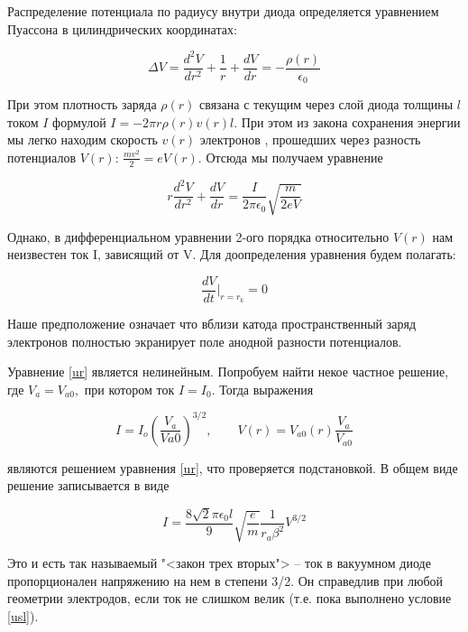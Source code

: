 \documentclass[12pt]{kiarticle} %
\begin{document}
Распределение потенциала по радиусу внутри диода определяется уравнением Пуассона в цилиндрических координатах:

\begin{equation}\label{}
\Delta V = \dfrac{d^2V}{dr^2} + \dfrac{1}{r} + \dfrac{dV}{dr} = - \dfrac{\rho(r)}{\epsilon_0}
\end{equation}

При этом плотность заряда $ \rho(r) $ связана с текущим через слой диода толщины $ l $ током $ I $ формулой $ I = -2\pi r \rho(r)v(r)l$. При этом из закона сохранения энергии мы легко находим скорость $ v(r) $ электронов , прошедших через разность потенциалов $ V(r) $: $ \frac{mv^2}{2} = eV(r) $.  Отсюда мы получаем уравнение 

\begin{equation}\label{ur}
r \dfrac{d^2V}{dr^2} + \dfrac{dV}{dr} = \dfrac{I}{2\pi\epsilon_0}\sqrt{\dfrac{m}{2eV}}
\end{equation}

Однако, в дифференциальном уравнении 2-ого порядка относительно $ V(r) $ нам неизвестен ток I, зависящий от V. Для доопределения уравнения будем полагать:

\begin{equation}\label{usl}
\dfrac{dV}{dt}\bigg |_{r=r_k} = 0
\end{equation} 

Наше предположение означает что вблизи катода пространственный заряд электронов полностью экранирует поле анодной разности потенциалов.

Уравнение \eqref{ur} является нелинейным. Попробуем  найти некое частное решение, где $ V_a = V_{a0}, $ при котором ток $ I = I_0 $. Тогда выражения 

\begin{equation}\label{}
I = I_o \left( \dfrac{V_a}{V{a0}} \right) ^{3/2}, \qquad V(r) = V_{a0}(r)\dfrac{V_a}{V_{a0}}
\end{equation}

являются решением уравнения \eqref{ur}, что проверяется подстановкой. В общем виде решение записывается в виде

\begin{equation}\label{3/2}
I = \dfrac{8\sqrt{2}\pi \epsilon_0 l}{9}\sqrt{\dfrac{e}{m}}\dfrac{1}{r_a\beta^2} V^{3/2}
\end{equation}

Это и есть так называемый "<закон трех вторых"> -- ток в вакуумном диоде пропорционален напряжению на нем в степени 3/2. Он справедлив при любой геометрии электродов, если ток не слишком велик (т.е. пока выполнено условие \eqref{usl}). 
\end{document}

